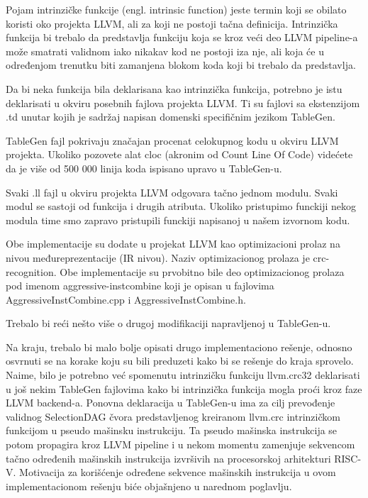 \documentclass[12pt,oneside]{memoir}
\begin{document}
Pojam intrinzičke funkcije (engl. intrinsic function) jeste termin koji se obilato koristi oko projekta LLVM, ali 
za koji ne postoji tačna definicija. Intrinzička funkcija bi trebalo da 
predstavlja funkciju koja se kroz veći deo LLVM pipeline-a može smatrati 
validnom iako nikakav kod ne postoji iza nje, ali koja će u određenjom trenutku 
biti zamanjena blokom koda koji bi trebalo da predstavlja.  

Da bi neka funkcija bila deklarisana kao intrinzička funkcija, potrebno je istu deklarisati u okviru posebnih fajlova projekta LLVM. Ti su fajlovi sa ekstenzijom .td unutar kojih je sadržaj napisan domenski specifičnim jezikom TableGen.

TableGen fajl pokrivaju značajan procenat celokupnog kodu u okviru LLVM projekta. Ukoliko pozovete alat cloc (akronim od Count Line Of Code) videćete da je više od 500 000 linija koda ispisano upravo u TableGen-u. 

Svaki .ll fajl u okviru projekta LLVM odgovara tačno jednom modulu. Svaki modul se sastoji od funkcija i drugih atributa. Ukoliko pristupimo funckiji nekog modula time smo zapravo pristupili funckiji napisanoj u našem izvornom kodu.

Obe implementacije su dodate u projekat LLVM kao optimizacioni prolaz na nivou 
međureprezentacije (IR nivou). Naziv optimizacionog prolaza je crc-recognition.
Obe implementacije su prvobitno bile deo optimizacionog prolaza pod imenom 
aggressive-instcombine koji je opisan u fajlovima AggressiveInstCombine.cpp i 
AggressiveInstCombine.h.

Trebalo bi reći nešto više o drugoj modifikaciji napravljenoj u TableGen-u. 

Na kraju, trebalo bi malo bolje opisati drugo implementaciono rešenje, odnosno 
osvrnuti se na korake koju su bili preduzeti kako bi se rešenje do kraja 
sprovelo. Naime, bilo je potrebno već spomenutu intrinzičku funkciju llvm.crc32 
deklarisati u još nekim TableGen fajlovima kako bi intrinzička funkcija mogla 
proći kroz faze LLVM backend-a. Ponovna deklaracija u TableGen-u ima za cilj 
prevođenje validnog SelectionDAG čvora predstavljenog kreiranom llvm.crc 
intrinzičkom funkcijom u pseudo mašinsku instrukciju. Ta pseudo mašinska 
instrukcija se potom propagira kroz LLVM pipeline i u nekom momentu zamenjuje 
sekvencom tačno određenih mašinskih instrukcija izvršivih na procesorskoj 
arhitekturi RISC-V. Motivacija za korišćenje određene sekvence mašinskih instrukcija 
u ovom implementacionom rešenju biće objašnjeno u narednom poglavlju.
\end{document}
